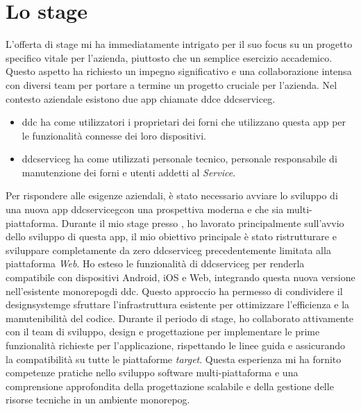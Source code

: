 \section{Lo stage}
L'offerta di stage mi ha immediatamente intrigato per il suo focus su un progetto specifico vitale per l'azienda, piuttosto che un semplice esercizio accademico.
Questo aspetto ha richiesto un impegno significativo e una collaborazione intensa con diversi team per portare a termine un progetto cruciale per l'azienda.
Nel contesto aziendale esistono due app chiamate \gls{ddc}\glox e \gls{ddcserviceg}\glox.
\begin{itemize}
    \item \gls{ddc} ha come utilizzatori i proprietari dei forni che utilizzano questa app per le funzionalità connesse dei loro dispositivi.
    \item \gls{ddcserviceg} ha come utilizzati personale tecnico, personale responsabile di manutenzione dei forni e utenti addetti al \textit{Service}.
\end{itemize}
Per rispondere alle esigenze aziendali, è stato necessario avviare lo sviluppo di una nuova app \gls{ddcserviceg}\glox con una prospettiva moderna e che sia multi-piattaforma.
Durante il mio stage presso \myAzienda, ho lavorato principalmente sull'avvio dello sviluppo di questa app, il mio obiettivo principale è stato ristrutturare e sviluppare completamente da zero \gls{ddcserviceg} precedentemente limitata alla piattaforma \textit{Web}.
Ho esteso le funzionalità di \gls{ddcserviceg} per renderla compatibile con dispositivi Android, iOS e Web, integrando questa nuova versione nell'esistente \gls{monorepog}\glox di \gls{ddc}\glox.
Questo approccio ha permesso di condividere il \gls{designsystemg}\glox e sfruttare l'infrastruttura esistente per ottimizzare l'efficienza e la manutenibilità del codice.
Durante il periodo di stage, ho collaborato attivamente con il team di sviluppo, design e progettazione per implementare le prime funzionalità richieste per l'applicazione, rispettando le linee guida e assicurando la compatibilità su tutte le piattaforme \textit{target}.
Questa esperienza mi ha fornito competenze pratiche nello sviluppo software multi-piattaforma e una comprensione approfondita della progettazione scalabile e della gestione delle risorse tecniche in un ambiente \gls{monorepog}.


\newpage